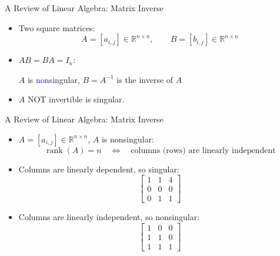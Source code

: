 \documentclass[aspectratio=169,hyperref,UTF8,CJK]{beamer}
\newcommand{\R}{\mathbb{R}}
\begin{document}
\begin{frame}{A Review of Linear Algebra: Matrix Inverse}
  \begin{itemize}
    \item Two square matrices:
      \begin{equation*}
        A=[a_{i,j}]\in\R^{n\times n},\qquad B=[b_{i,j}]\in\R^{n\times n}
      \end{equation*}
    \item $AB=BA=I_n$:

      $A$ is \textcolor{blue}{non}singular, $B=A^{-1}$ is the inverse of $A$
    \item $A$ NOT invertible is singular.
  \end{itemize}
\end{frame}

\begin{frame}{A Review of Linear Algebra: Matrix Inverse}
  \small
  \begin{itemize}
    \item $A=[a_{i,j}]\in\R^{n\times n}$, $A$ is nonsingular:
      \begin{equation*}
        \operatorname{rank}(A)=n\quad\Longleftrightarrow\quad\text{columns (rows) are linearly independent}
      \end{equation*}
    \item Columns are linearly dependent, so singular:
      \begin{equation*}
        \begin{bmatrix}1&1&4\\0&0&0\\0&1&1\end{bmatrix}
      \end{equation*}
    \item Columns are linearly independent, so nonsingular:
      \begin{equation*}
        \begin{bmatrix}1&0&0\\1&1&0\\1&1&1\end{bmatrix}
      \end{equation*}
  \end{itemize}
\end{frame}
\end{document}
